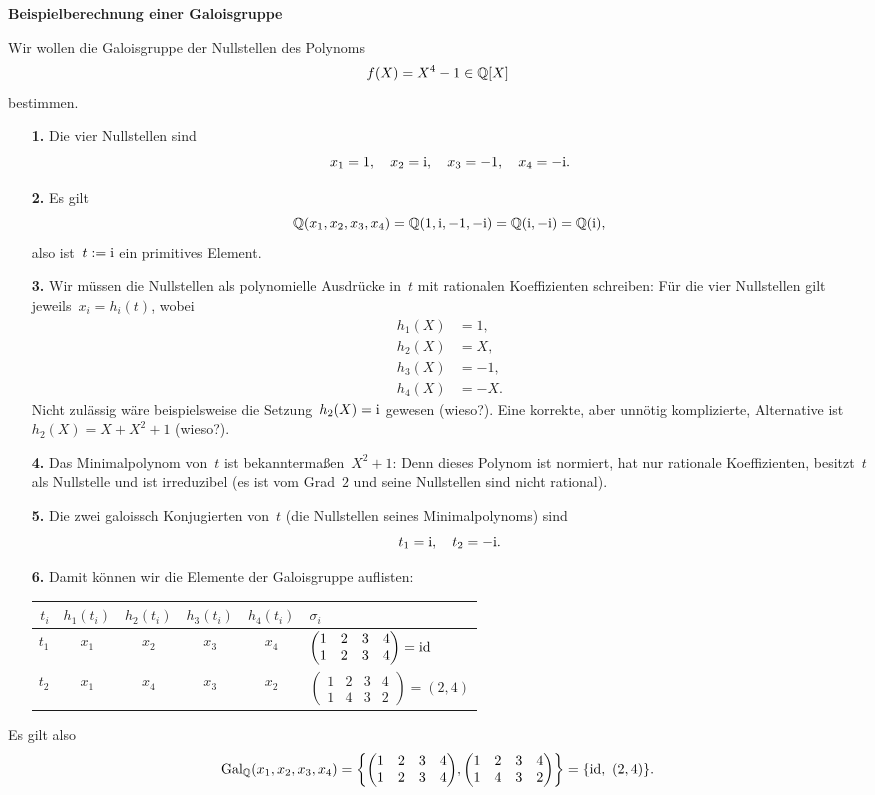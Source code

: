 \documentclass{../../algblatt}
\begin{document}
\begin{center}\huge \sffamily\textbf{Beispielberechnung einer Galoisgruppe}\end{center}

Wir wollen die Galoisgruppe der Nullstellen des Polynoms
\[ f(X) = X^4 - 1 \in \mathbb{Q}[X] \]
bestimmen.

\begin{enumerate}
\item[\textbf{1.}] Die vier Nullstellen sind
\[ x_1 = 1,\quad
  x_2 = \mathrm{i},\quad
  x_3 = -1,\quad
  x_4 = -\mathrm{i}. \]

\item[\textbf{2.}] Es gilt
\[ \mathbb{Q}(x_1,x_2,x_3,x_4) = \mathbb{Q}(1,\mathrm{i},-1,-\mathrm{i}) = \mathbb{Q}(\mathrm{i},-\mathrm{i}) = \mathbb{Q}(\mathrm{i}), \]
also ist~$t := \mathrm{i}$ ein primitives Element.

\item[\textbf{3.}] Wir müssen die Nullstellen als polynomielle Ausdrücke in~$t$ mit
rationalen Koeffizienten schreiben: Für die vier Nullstellen gilt jeweils~$x_i
= h_i(t)$, wobei
\begin{align*}
  h_1(X) &= 1, \\
  h_2(X) &= X, \\
  h_3(X) &= -1, \\
  h_4(X) &= -X.
\end{align*}
Nicht zulässig wäre beispielsweise die Setzung~$h_2(X) = \mathrm{i}$ gewesen (wieso?).
Eine korrekte, aber unnötig komplizierte, Alternative ist~$h_2(X) = X + X^2 +
1$ (wieso?).

\item[\textbf{4.}] Das Minimalpolynom von~$t$ ist bekanntermaßen~$X^2 + 1$: Denn
dieses Polynom ist normiert, hat nur rationale Koeffizienten, besitzt~$t$ als
Nullstelle und ist irreduzibel (es ist vom Grad~$2$ und seine Nullstellen sind
nicht rational).

\item[\textbf{5.}] Die zwei galoissch Konjugierten von~$t$ (die Nullstellen
seines Minimalpolynoms) sind
\[ t_1 = \mathrm{i},\quad
  t_2 = -\mathrm{i}. \]

\item[\textbf{6.}] Damit können wir die Elemente der Galoisgruppe auflisten:
\begin{center}
  \begin{tabular}{@{}r|cccc|l@{}}
    $t_i$ & $h_1(t_i)$ & $h_2(t_i)$ & $h_3(t_i)$ & $h_4(t_i)$ & $\sigma_i$ \\\hline
    $t_1$ & $x_1$ & $x_2$ & $x_3$ & $x_4$ &
      $\begin{pmatrix}1&2&3&4\\1&2&3&4\end{pmatrix} = \mathrm{id}$ \\[1.5em]
    $t_2$ & $x_1$ & $x_4$ & $x_3$ & $x_2$ &
      $\begin{pmatrix}1&2&3&4\\1&4&3&2\end{pmatrix} = (2,4)$
  \end{tabular}
\end{center}
\end{enumerate}

Es gilt also
\[ \mathrm{Gal}_{\mathbb{Q}}(x_1,x_2,x_3,x_4) = \left\{
  \begin{pmatrix}1&2&3&4\\1&2&3&4\end{pmatrix}\!,
  \begin{pmatrix}1&2&3&4\\1&4&3&2\end{pmatrix}
\right\} = \left\{ \mathrm{id},\ (2, 4) \right\}\!. \]
\end{document}
